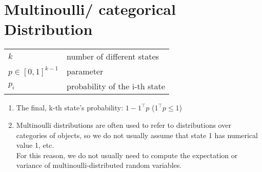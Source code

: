 \chapter{Multinoulli/ categorical Distribution \cite{dnn-deep-learning-ian}} \label{Multinoulli/ categorical Distribution}

\begin{customTableWrapper}{2}
\begin{longtable}{l p{8cm}}

    $k$ & number of different states \\

    $p \in [0,1]^{k-1}$ & parameter \\

    $p_i$ & probability of the i-th state\\

    
\end{longtable}
\end{customTableWrapper}


\begin{enumerate}
    \item The final, k-th state’s probability: $1 - 1^\top p$ ($1^\top p \leq 1$)

    \item Multinoulli distributions are often used to refer to distributions over categories of objects, so we do not usually assume that state 1 has numerical value 1, etc.\\
    For this reason, we do not usually need to compute the expectation or variance of multinoulli-distributed random variables.
\end{enumerate}







